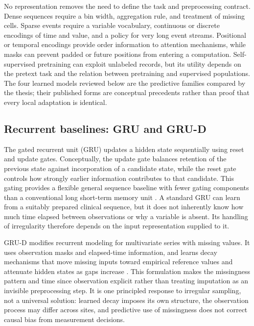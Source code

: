 No representation removes the need to define the task and preprocessing contract.  Dense sequences require a bin width, aggregation rule, and treatment of missing cells.  Sparse events require a variable vocabulary, continuous or discrete encodings of time and value, and a policy for very long event streams.  Positional or temporal encodings provide order information to attention mechanisms, while masks can prevent padded or future positions from entering a computation.  Self-supervised pretraining can exploit unlabeled records, but its utility depends on the pretext task and the relation between pretraining and supervised populations.  The four learned models reviewed below are the predictive families compared by the thesis; their published forms are conceptual precedents rather than proof that every local adaptation is identical.

\subsection{Recurrent baselines: GRU and GRU-D}

The gated recurrent unit (GRU) updates a hidden state sequentially using reset and update gates.  Conceptually, the update gate balances retention of the previous state against incorporation of a candidate state, while the reset gate controls how strongly earlier information contributes to that candidate.  This gating provides a flexible general sequence baseline with fewer gating components than a conventional long short-term memory unit \cite{cho2014gru}.  A standard GRU can learn from a suitably prepared clinical sequence, but it does not inherently know how much time elapsed between observations or why a variable is absent.  Its handling of irregularity therefore depends on the input representation supplied to it.

GRU-D modifies recurrent modeling for multivariate series with missing values.  It uses observation masks and elapsed-time information, and learns decay mechanisms that move missing inputs toward empirical reference values and attenuate hidden states as gaps increase \cite{che2018grud}.  This formulation makes the missingness pattern and time since observation explicit rather than treating imputation as an invisible preprocessing step.  It is one principled response to irregular sampling, not a universal solution: learned decay imposes its own structure, the observation process may differ across sites, and predictive use of missingness does not correct causal bias from measurement decisions.


